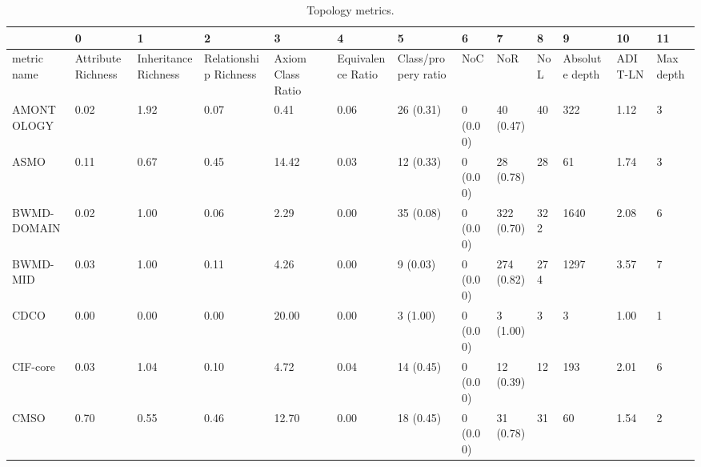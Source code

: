 \begin{table}
\centering
\caption{Topology metrics.}
\label{tab:topology-metrics}
\begin{tabular}{m{3.5cm}m{2cm}m{2cm}m{2cm}m{2cm}m{2cm}m{2cm}m{2cm}m{2cm}m{2cm}m{2cm}m{2cm}m{2cm}}
\toprule
{} &                  0  &                    1  &                     2  &                 3  &                 4  &                   5  &         6  &          7  &   8  &              9  &       10 &         11 \\
\midrule
metric name                 &  Attribute Richness &  Inheritance Richness &  Relationship Richness &  Axiom Class Ratio &  Equivalence Ratio &  Class/propery ratio &        NoC &         NoR &  NoL &  Absolute depth &  ADIT-LN &  Max depth \\
AMONTOLOGY                  &                0.02 &                  1.92 &                   0.07 &               0.41 &               0.06 &            26 (0.31) &   0 (0.00) &   40 (0.47) &   40 &             322 &     1.12 &          3 \\
ASMO                        &                0.11 &                  0.67 &                   0.45 &              14.42 &               0.03 &            12 (0.33) &   0 (0.00) &   28 (0.78) &   28 &              61 &     1.74 &          3 \\
BWMD-DOMAIN                 &                0.02 &                  1.00 &                   0.06 &               2.29 &               0.00 &            35 (0.08) &   0 (0.00) &  322 (0.70) &  322 &            1640 &     2.08 &          6 \\
BWMD-MID                    &                0.03 &                  1.00 &                   0.11 &               4.26 &               0.00 &             9 (0.03) &   0 (0.00) &  274 (0.82) &  274 &            1297 &     3.57 &          7 \\
CDCO                        &                0.00 &                  0.00 &                   0.00 &              20.00 &               0.00 &             3 (1.00) &   0 (0.00) &    3 (1.00) &    3 &               3 &     1.00 &          1 \\
CIF-core                    &                0.03 &                  1.04 &                   0.10 &               4.72 &               0.04 &            14 (0.45) &   0 (0.00) &   12 (0.39) &   12 &             193 &     2.01 &          6 \\
CMSO                        &                0.70 &                  0.55 &                   0.46 &              12.70 &               0.00 &            18 (0.45) &   0 (0.00) &   31 (0.78) &   31 &              60 &     1.54 &          2 \\

\end{tabular}
\end{table}
